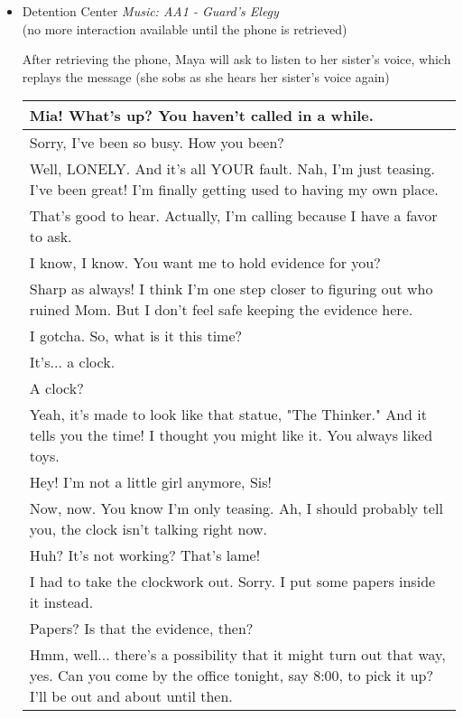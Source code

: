 \begin{itemize}
\item Detention Center
\textit{Music: AA1 - Guard's Elegy}\\

(no more interaction available until the phone is retrieved)

After retrieving the phone, Maya will ask to listen to her sister's voice, which replays the message (she sobs as she hears her sister's voice again)\\
\newpage
\begin{tabular}{p{11cm}}
Mia! What's up? You haven't called in a while. \\\hline
Sorry, I've been so busy. How you been?\\\hline
Well, LONELY. And it's all YOUR fault. Nah, I'm just teasing. I've been great! I'm finally getting used to having my own place.\\\hline
That's good to hear. Actually, I'm calling because I have a favor to ask.\\\hline
I know, I know. You want me to hold evidence for you?\\\hline
Sharp as always! I think I'm one step closer to figuring out who ruined Mom. But I don't feel safe keeping the evidence here.\\\hline
I gotcha. So, what is it this time?\\\hline
It's... a clock.\\\hline
A clock?\\\hline
Yeah, it's made to look like that statue, "The Thinker." And it tells you the time! I thought you might like it. You always liked toys.\\\hline
Hey! I'm not a little girl anymore, Sis!\\\hline
Now, now. You know I'm only teasing. Ah, I should probably tell you, the clock isn't talking right now.\\\hline
Huh? It's not working? That's lame!\\\hline
I had to take the clockwork out. Sorry. I put some papers inside it instead.\\\hline

Papers? Is that the evidence, then? \\\hline

Hmm, well... there's a possibility that it might turn out that way, yes. Can you come by the office tonight, say 8:00, to pick it up? I'll be out and about until then.\\\hline


\end{tabular}
\end{itemize}
